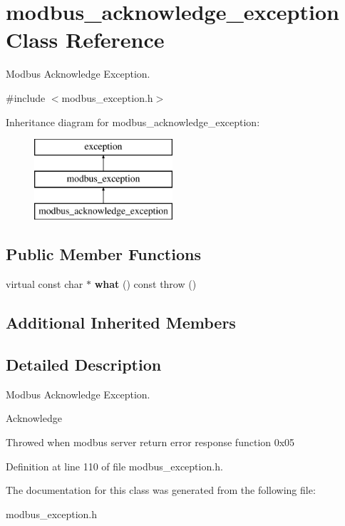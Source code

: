 \hypertarget{classmodbus__acknowledge__exception}{}\section{modbus\+\_\+acknowledge\+\_\+exception Class Reference}
\label{classmodbus__acknowledge__exception}


Modbus Acknowledge Exception.  




{\ttfamily \#include $<$modbus\+\_\+exception.\+h$>$}

Inheritance diagram for modbus\+\_\+acknowledge\+\_\+exception\+:\begin{figure}[H]
\begin{center}
\leavevmode
\includegraphics[height=3.000000cm]{classmodbus__acknowledge__exception}
\end{center}
\end{figure}
\subsection*{Public Member Functions}
\begin{DoxyCompactItemize}
\item 
\mbox{\label{classmodbus__acknowledge__exception_a6542c8a1a42041ac2498c444ef42b62d}} 
virtual const char $\ast$ {\bfseries what} () const  throw ()
\end{DoxyCompactItemize}
\subsection*{Additional Inherited Members}


\subsection{Detailed Description}
Modbus Acknowledge Exception. 

Acknowledge

Throwed when modbus server return error response function 0x05 

Definition at line 110 of file modbus\+\_\+exception.\+h.



The documentation for this class was generated from the following file\+:\begin{DoxyCompactItemize}
\item 
modbus\+\_\+exception.\+h\end{DoxyCompactItemize}
